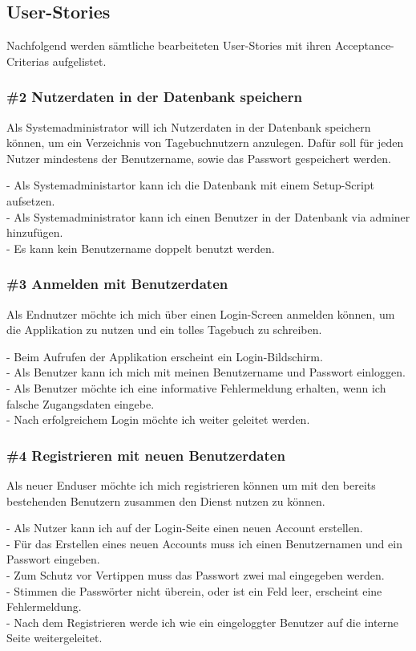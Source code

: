 \subsection{User-Stories}
Nachfolgend werden sämtliche bearbeiteten User-Stories mit ihren Acceptance-Criterias aufgelistet.


\subsubsection*{\#2 Nutzerdaten in der Datenbank speichern}
Als Systemadministrator will ich Nutzerdaten in der Datenbank speichern können, um ein Verzeichnis von Tagebuchnutzern anzulegen. Dafür soll für jeden Nutzer mindestens der Benutzername, sowie das Passwort gespeichert werden.
  
\noindent
- Als Systemadministartor kann ich die Datenbank mit einem Setup-Script aufsetzen.\\
- Als Systemadministrator kann ich einen Benutzer in der Datenbank via adminer hinzufügen.\\
- Es kann kein Benutzername doppelt benutzt werden.


\subsubsection*{\#3 Anmelden mit Benutzerdaten}
Als Endnutzer möchte ich mich über einen Login-Screen anmelden können, um die Applikation zu nutzen und ein tolles Tagebuch zu schreiben.

\noindent
- Beim Aufrufen der Applikation erscheint ein Login-Bildschirm.\\
- Als Benutzer kann ich mich mit meinen Benutzername und Passwort einloggen.\\
- Als Benutzer möchte ich eine informative Fehlermeldung erhalten, wenn ich falsche Zugangsdaten eingebe.\\
- Nach erfolgreichem Login möchte ich weiter geleitet werden.


\subsubsection*{\#4 Registrieren mit neuen Benutzerdaten}
Als neuer Enduser möchte ich mich registrieren können um mit den bereits bestehenden Benutzern zusammen den Dienst nutzen zu können.

\noindent
- Als Nutzer kann ich auf der Login-Seite einen neuen Account erstellen.\\
- Für das Erstellen eines neuen Accounts muss ich einen Benutzernamen und ein Passwort eingeben.\\
- Zum Schutz vor Vertippen muss das Passwort zwei mal eingegeben werden.\\
- Stimmen die Passwörter nicht überein, oder ist ein Feld leer, erscheint eine Fehlermeldung.\\
- Nach dem Registrieren werde ich wie ein eingeloggter Benutzer auf die interne Seite weitergeleitet.


